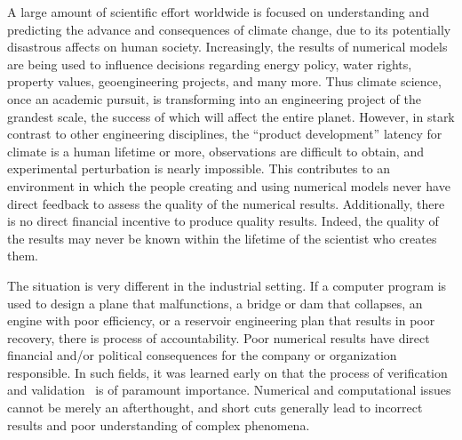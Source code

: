 A large amount of scientific effort worldwide is focused on understanding and predicting the advance and consequences of climate change, due to its potentially disastrous affects on human society.
Increasingly, the results of numerical models are being used to influence decisions regarding energy policy, water rights, property values, geoengineering projects, and many more.
Thus climate science, once an academic pursuit, is transforming into an engineering project of the grandest scale, the success of which will affect the entire planet.
However, in stark contrast to other engineering disciplines, the ``product development'' latency for climate is a human lifetime or more, observations are difficult to obtain, and experimental perturbation is nearly impossible.
This contributes to an environment in which the people creating and using numerical models never have direct feedback to assess the quality of the numerical results.
Additionally, there is no direct financial incentive to produce quality results.
Indeed, the quality of the results may never be known within the lifetime of the scientist who creates them.

The situation is very different in the industrial setting.
If a computer program is used to design a plane that malfunctions, a bridge or dam that collapses, an engine with poor efficiency, or a reservoir engineering plan that results in poor recovery, there is process of accountability.
Poor numerical results have direct financial and/or political consequences for the company or organization responsible.
In such fields, it was learned early on that the process of verification and validation~\citep{roache1998verification,babuska2004vav} is of paramount importance.
Numerical and computational issues cannot be merely an afterthought, and short cuts generally lead to incorrect results and poor understanding of complex phenomena.

